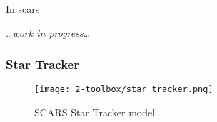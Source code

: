         

        In \ac{scars} 

        \dots\textit{work in progress}\dots



    \subsubsection{Star Tracker}

        \begin{figure}[H]
            \centering
            \texttt{[image: 2-toolbox/star\_tracker.png]}
            \caption{SCARS Star Tracker model}
            \label{fig:star_tracker}
        \end{figure}